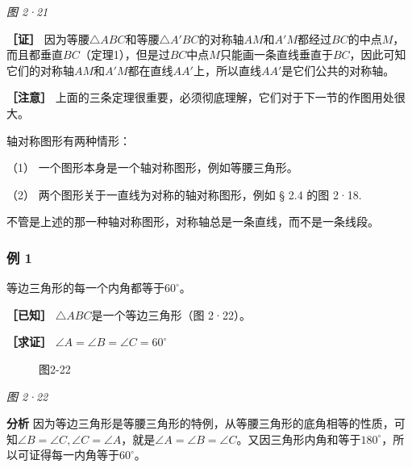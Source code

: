 \emph{图 2·21}

\textbf{［证］}
因为等腰\(\triangle ABC\)和等腰\(\triangle A'BC\)的对称轴\(AM\)和\(A'M\)都经过\(BC\)的中点\(M\)，而且都垂直\(BC\)（定理1），但是过\(BC\)中点\(M\)只能画一条直线垂直于\(BC\)，因此可知它们的对称轴\(AM\)和\(A'M\)都在直线\(AA'\)上，所以直线\(AA'\)是它们公共的对称轴。

\textbf{［注意］}
上面的三条定理很重要，必须彻底理解，它们对于下一节的作图用处很大。

轴对称图形有两种情形：

（1） 一个图形本身是一个轴对称图形，例如等腰三角形。

（2） 两个图形关于一直线为对称的轴对称图形，例如 § 2.4 的图 2·18.

不管是上述的那一种轴对称图形，对称轴总是一条直线，而不是一条线段。

\subsubsection{例 1}

等边三角形的每一个内角都等于\(60^{\circ}\)。

\textbf{［已知］} \(\triangle ABC\)是一个等边三角形（图 2·22）。

\textbf{［求证］} \(\angle A = \angle B = \angle C = 60^{\circ}\)

\begin{figure}
\centering
{}
\caption{图2-22}
\end{figure}

\emph{图 2·22}

\textbf{分析}
因为等边三角形是等腰三角形的特例，从等腰三角形的底角相等的性质，可知\(\angle B = \angle C, \angle C = \angle A\)，就是\(\angle A = \angle B = \angle C\)。又因三角形内角和等于\(180^{\circ}\)，所以可证得每一内角等于\(60^{\circ}\)。

